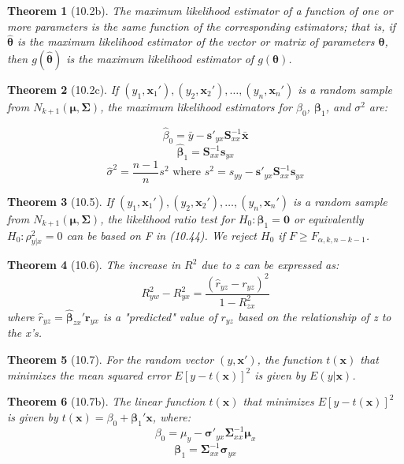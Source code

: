\documentclass{article}
\newtheorem{theorem}{Theorem}[section]
\begin{document}
\begin{theorem}[10.2b]
The maximum likelihood estimator of a function of one or more parameters is the same function of the corresponding estimators; that is, if $\hat{\boldsymbol{\theta}}$ is the maximum likelihood estimator of the vector or matrix of parameters $\boldsymbol{\theta}$, then $g(\hat{\boldsymbol{\theta}})$ is the maximum likelihood estimator of $g(\boldsymbol{\theta})$.
\end{theorem}

\begin{theorem}[10.2c]
If $(y_1, \mathbf{x}_1'), (y_2, \mathbf{x}_2'), \ldots, (y_n, \mathbf{x}_n')$ is a random sample from $N_{k+1}(\boldsymbol{\mu}, \boldsymbol{\Sigma})$, the maximum likelihood estimators for $\beta_0$, $\boldsymbol{\beta}_1$, and $\sigma^2$ are:

\[\hat{\beta}_0 = \bar{y} - \mathbf{s}'_{yx}\mathbf{S}_{xx}^{-1}\bar{\mathbf{x}}\]
\[\hat{\boldsymbol{\beta}}_1 = \mathbf{S}_{xx}^{-1}\mathbf{s}_{yx}\]
\[\hat{\sigma}^2 = \frac{n-1}{n}s^2 \text{ where } s^2 = s_{yy} - \mathbf{s}'_{yx}\mathbf{S}_{xx}^{-1}\mathbf{s}_{yx}\]
\end{theorem}

\begin{theorem}[10.5]
If $(y_1, \mathbf{x}_1'), (y_2, \mathbf{x}_2'), \ldots, (y_n, \mathbf{x}_n')$ is a random sample from $N_{k+1}(\boldsymbol{\mu}, \boldsymbol{\Sigma})$, the likelihood ratio test for $H_0: \boldsymbol{\beta}_1 = \mathbf{0}$ or equivalently $H_0: \rho^2_{y|x} = 0$ can be based on F in (10.44). We reject $H_0$ if $F \geq F_{\alpha,k,n-k-1}$.
\end{theorem}

\begin{theorem}[10.6]
The increase in $R^2$ due to z can be expressed as:
\[R^2_{yw} - R^2_{yx} = \frac{(\hat{r}_{yz} - r_{yz})^2}{1-R^2_{zx}}\]
where $\hat{r}_{yz} = \hat{\boldsymbol{\beta}}_{zx}'\mathbf{r}_{yx}$ is a "predicted" value of $r_{yz}$ based on the relationship of z to the x's.
\end{theorem}

\begin{theorem}[10.7]
For the random vector $(y, \mathbf{x}')$, the function $t(\mathbf{x})$ that minimizes the mean squared error $E[y - t(\mathbf{x})]^2$ is given by $E(y|\mathbf{x})$.
\end{theorem}

\begin{theorem}[10.7b]
The linear function $t(\mathbf{x})$ that minimizes $E[y - t(\mathbf{x})]^2$ is given by $t(\mathbf{x}) = \beta_0 + \boldsymbol{\beta}_1'\mathbf{x}$, where:
\[\beta_0 = \mu_y - \boldsymbol{\sigma}'_{yx}\boldsymbol{\Sigma}_{xx}^{-1}\boldsymbol{\mu}_x\]
\[\boldsymbol{\beta}_1 = \boldsymbol{\Sigma}_{xx}^{-1}\boldsymbol{\sigma}_{yx}\]
\end{theorem}
\end{document}
